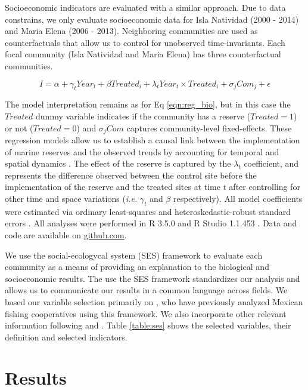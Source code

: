 \documentclass{frontiersSCNS}
\theoremstyle{definition}
\theoremstyle{definition}
\theoremstyle{definition}
\theoremstyle{remark}
\begin{document}
Socioeconomic indicators are evaluated with a similar approach. Due to
data constrains, we only evaluate socioeconomic data for Isla Natividad
(2000 - 2014) and Maria Elena (2006 - 2013). Neighboring communities are
used as counterfactuals that allow us to control for unobserved
time-invariants. Each focal community (Isla Natividad and Maria Elena)
has three counterfactual communities.

\begin{equation}
I = \alpha + \gamma_{t} Year_t + \beta Treated_i + \lambda_{t} Year_t\times Treated_i + \sigma_jCom_j +\epsilon
\label{eqn:soc_reg}
\end{equation}

The model interpretation remains as for Eq \ref{eqn:reg_bio}, but in
this case the \(Treated\) dummy variable indicates if the community has
a reserve (\(Treated = 1\)) or not (\(Treated = 0\)) and \(\sigma_jCom\)
captures community-level fixed-effects. These regression models allow us
to establish a causal link between the implementation of marine reserves
and the observed trends by accounting for temporal and spatial dynamics
\citep{depalma_2018}. The effect of the reserve is captured by the
\(\lambda_t\) coefficient, and represents the difference observed
between the control site before the implementation of the reserve and
the treated sites at time \(t\) after controlling for other time and
space variations (\emph{i.e.} \(\gamma_t\) and \(\beta\) respectively).
All model coefficients were estimated via ordinary least-squares and
heteroskedastic-robust standard errors \citep{zeileis_2004-7n}. All
analyses were performed in R 3.5.0 and R Studio 1.1.453 \citep{R_2018}.
Data and code are available on
\href{https://github.com/jcvdav/ReserveEffect}{github.com}.

We use the social-ecologycal system (SES) framework to evaluate each
community as a means of providing an explanation to the biological and
socioeconomic results. The use the SES framework standardizes our
analysis and allows us to communicate our results in a common language
across fields. We based our variable selection primarily on
\citet{leslie_2015-na,basurto_2013-oq}, who have previously analyzed
Mexican fishing cooperatives using this framework. We also incorporate
other relevant information following \citet{difranco_2016-Xw} and
\citet{edgar_2014-UO}. Table \ref{table:ses} shows the selected
variables, their definition and selected indicators.

\section{Results}\label{results}
\end{document}
